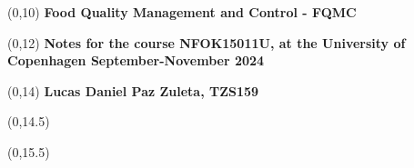 \begin{titlepage}


\begin{textblock}{9.4}(0,10)
    \Huge{\sffamily\bfseries{Food Quality Management and Control - FQMC}}
\end{textblock}

\begin{textblock}{9.4}(0,12)
    \LARGE{\sffamily\bfseries{Notes for the course NFOK15011U, at the University of Copenhagen September-November 2024}}
\end{textblock}

\begin{textblock}{9.4}(0,14)
    \large{\sffamily\bfseries{Lucas Daniel Paz Zuleta, TZS159}}
\end{textblock}

\begin{textblock}{9.4}(0,14.5)
    \large{}
\end{textblock}

\begin{textblock}{9.4}(0,15.5)
    \large{}
\end{textblock}

\end{titlepage}
